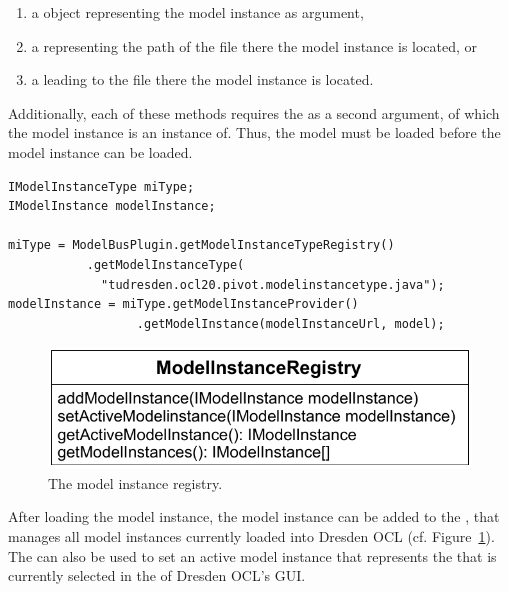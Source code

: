 \begin{enumerate}
	\item a  object representing the model instance as argument,
	\item a  representing the path of the file there the model
	  instance is located, or
	\item a  leading to the file there the model instance is located.
\end{enumerate}

Additionally, each of these methods requires the  as a second
argument, of which the model instance is an instance of. Thus, the model must be
loaded before the model instance can be loaded.

\lstset{
  language=Java
}
\begin{lstlisting}[caption={How to load a model instance.}, captionpos=b, label=lst:integration:loadModelInstance, float]
IModelInstanceType miType;
IModelInstance modelInstance;

miType = ModelBusPlugin.getModelInstanceTypeRegistry()
           .getModelInstanceType(
             "tudresden.ocl20.pivot.modelinstancetype.java");
modelInstance = miType.getModelInstanceProvider()
                  .getModelInstance(modelInstanceUrl, model);
\end{lstlisting}

\begin{figure}[!b]
	\centering
	\includegraphics[width=.75\linewidth]{figures/integration/modelInstanceRegistry}
	\caption{The model instance registry.}
	\label{pic:integration:modelInstanceRegistry}
\end{figure}

After loading the model instance, the model instance can be added to the
, that manages all model instances currently
loaded into Dresden OCL (cf.
Figure~\ref{pic:integration:modelInstanceRegistry}).
The  can also be used to set an active model
instance that represents the  that is currently selected in
the  of Dresden OCL's GUI.




